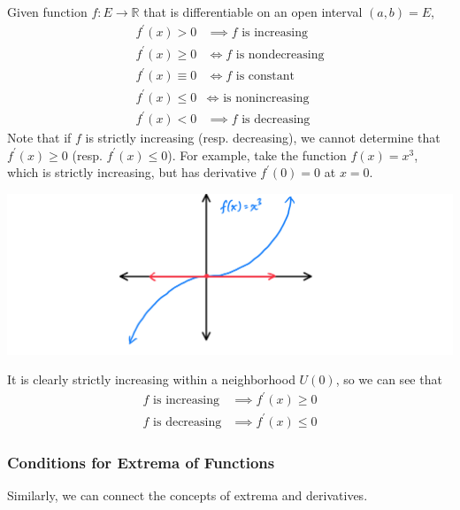     \begin{theorem}
    Given function $f: E \longrightarrow \mathbb{R}$ that is differentiable on an open interval $(a, b) = E$, 
    \begin{align*}
        f^\prime (x) > 0 & \implies f \text{ is increasing} \\
        f^\prime (x) \geq 0 & \iff f \text{ is nondecreasing} \\
        f^\prime (x) \equiv 0 & \iff f \text{ is constant} \\
        f^\prime (x) \leq 0 & \iff \text{ is nonincreasing} \\
        f^\prime (x) < 0 & \implies f \text{ is decreasing} 
    \end{align*}
    Note that if $f$ is strictly increasing (resp. decreasing), we cannot determine that $f^\prime(x) \geq 0$ (resp. $f^\prime (x) \leq 0$). For example, take the function $f(x) = x^3$, which is strictly increasing, but has derivative $f^\prime (0) = 0$ at $x = 0$. 
    \begin{center}
        \includegraphics[scale=0.25]{img/Monotonicity_Counterexample_x3.PNG}
    \end{center}
    It is clearly strictly increasing within a neighborhood $U(0)$, so we can see that
    \begin{align*}
        f \text{ is increasing} & \implies f^\prime (x) \geq 0 \\
        f \text{ is decreasing} & \implies f^\prime (x) \leq 0
    \end{align*}
    \end{theorem}


    \subsubsection{Conditions for Extrema of Functions}
    Similarly, we can connect the concepts of extrema and derivatives. 

